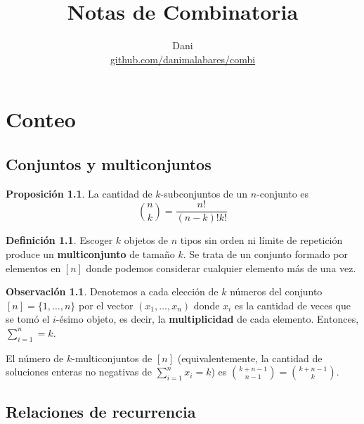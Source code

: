 \documentclass[spanish]{book}
\title{Notas de Combinatoria}
\author{Dani\\
\href{https://github.com/danimalabares/combi}{github.com/danimalabares/combi}}
\renewcommand{\contentsname}{Índice}
\theoremstyle{definition}
\newtheorem*{defn}{Definición}
\newtheorem*{obs}{Observación}
\newtheorem*{prop}{Proposición}
\begin{document}
	\maketitle
	\addcontentsline{toc}{part}{\contentsname}
	\tableofcontents
	
\part{Conteo}
\chapter{Conjuntos y multiconjuntos}\label{chap:set-multiset}
	\begin{prop}
		La cantidad de $k$-subconjuntos de un $n$-conjunto es \[{n\choose k}=\frac{n!}{(n-k)!k!}\]
	\end{prop}
	\begin{defn}
		Escoger $k$ objetos de $n$ tipos sin orden ni límite de repetición produce un \textbf{multiconjunto} de tamaño $k$. Se trata de un conjunto formado por elementos en $[n]$ donde podemos considerar cualquier elemento más de una vez.
	\end{defn}
	\begin{obs}
		Denotemos a cada elección de $k$ números del conjunto $[n]=\{1,\ldots,n\}$ por el vector $(x_1,\ldots,x_n)$ donde $x_i$ es la cantidad de veces que se tomó el $i$-ésimo objeto, es decir, la \textbf{multiplicidad} de cada elemento. Entonces, $\sum_{i=1}^n=k$.
	\end{obs}
	\begin{teo}\label{thm:thm1}
		El número de $k$-multiconjuntos de $[n]$ (equivalentemente, la cantidad de soluciones enteras no negativas de $\sum_{i=1}^nx_i=k$) es ${k+n-1\choose n-1}={k+n-1\choose k}$.
	\end{teo}
\chapter{Relaciones de recurrencia}
\end{document}
